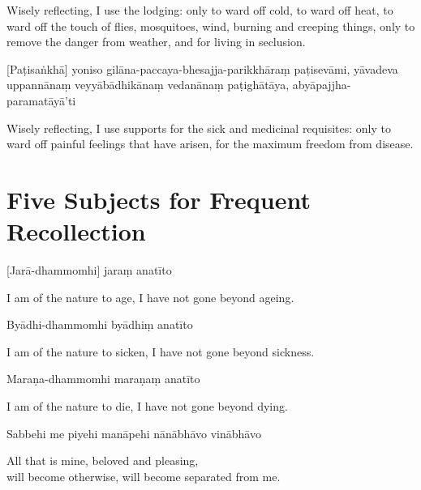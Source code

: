 \begin{english}
  Wisely reflecting, I use the lodging: only to ward off cold, to ward off heat,
  to ward off the touch of flies, mosquitoes, wind, burning and creeping things,
  only to remove the danger from weather, and for living in seclusion.
\end{english}

[Paṭisaṅkhā] yoniso gilāna-paccaya-bhesajja-parikkhāraṃ paṭisevāmi, yāvadeva
uppannānaṃ veyyābādhikānaṃ vedanānaṃ paṭighātāya, abyāpajjha-paramatāyā'ti

\begin{english}
  Wisely reflecting, I use supports for the sick and medicinal requisites: only
  to ward off painful feelings that have arisen, for the maximum freedom from
  disease.
\end{english}


\section{Five Subjects for Frequent Recollection}

\begin{leader}
\end{leader}



[Jarā-dhammomhi] jaraṃ anatīto

\begin{english}
  I am of the nature to age, I have not gone beyond ageing.
\end{english}

Byādhi-dhammomhi byādhiṃ anatīto

\begin{english}
  I am of the nature to sicken, I have not gone beyond sickness.
\end{english}

Maraṇa-dhammomhi maraṇaṃ anatīto

\begin{english}
  I am of the nature to die, I have not gone beyond dying.
\end{english}

Sabbehi me piyehi manāpehi nānābhāvo vinābhāvo

\begin{english}
  All that is mine, beloved and pleasing,\\
  will become otherwise, will become separated from me.
\end{english}

